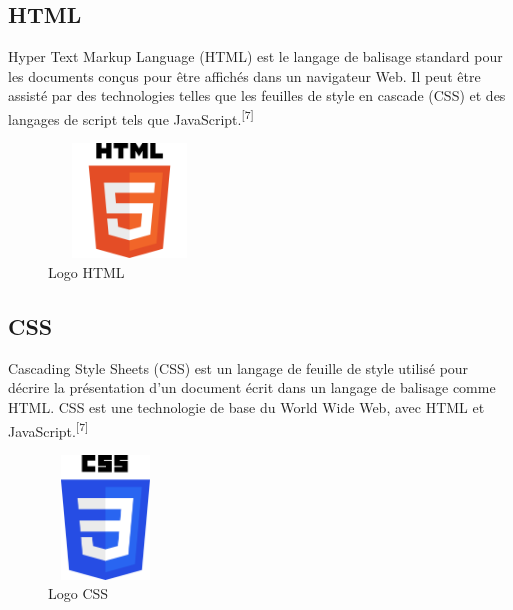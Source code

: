 \documentclass[12pt]{report}
\begin{document}
\subsection{HTML}

Hyper Text Markup Language (HTML) est le langage de balisage standard pour les documents conçus pour être affichés dans un navigateur Web. Il peut être assisté par des technologies telles que les feuilles de style en cascade (CSS) et des langages de script tels que JavaScript.\textsuperscript{[7]}

\vspace{0.05in}

\begin{figure}[h]
\centering
    \includegraphics[width = 1.70in, height = 1.2in]{../Images/Html.png}
\caption{Logo HTML}
\end{figure}

\vspace*{-0.3in}

\subsection{CSS}

Cascading Style Sheets (CSS) est un langage de feuille de style utilisé pour décrire la présentation d'un document écrit dans un langage de balisage comme HTML. CSS est une technologie de base du World Wide Web, avec HTML et JavaScript.\textsuperscript{[7]}

\vspace{-0.02in}

\begin{figure}[h]
\centering
    \includegraphics[width = 1.2in, height = 1.3in]{../Images/CSS.png}
\caption{Logo CSS}
\end{figure}

\newpage
\end{document}

